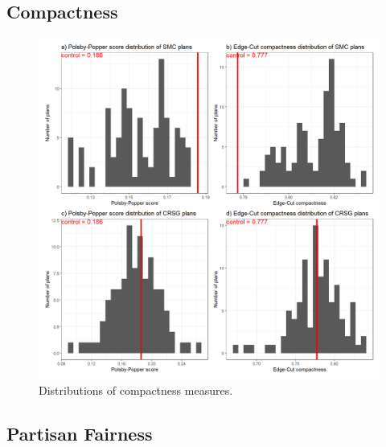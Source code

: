 \subsection{Compactness}
\begin{figure}
    \centering
    \includegraphics[width=\textwidth]{img/compact_hist.png}
    \caption{Distributions of compactness measures.}
    \label{fig:compact_hist}
\end{figure}


\subsection{Partisan Fairness}


